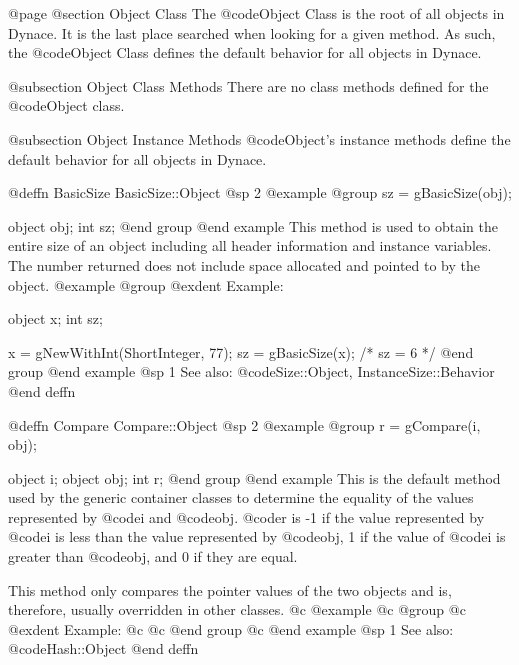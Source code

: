 @page
@section Object Class
The @code{Object} Class is the root of all objects in Dynace.  It is the
last place searched when looking for a given method.  As such, the
@code{Object} Class defines the default behavior for all objects in Dynace.

@subsection Object Class Methods
There are no class methods defined for the @code{Object} class.

@subsection Object Instance Methods
@code{Object}'s instance methods define the default behavior for all objects
in Dynace.











@deffn {BasicSize} BasicSize::Object
@sp 2
@example
@group
sz = gBasicSize(obj);

object  obj;
int     sz;
@end group
@end example
This method is used to obtain the entire size of an object including
all header information and instance variables.  The number returned
does not include space allocated and pointed to by the object.
@example
@group
@exdent Example:

object  x;
int     sz;

x = gNewWithInt(ShortInteger, 77);
sz = gBasicSize(x);    /*  sz = 6  */
@end group
@end example
@sp 1
See also:  @code{Size::Object, InstanceSize::Behavior}
@end deffn
















@deffn {Compare} Compare::Object
@sp 2
@example
@group
r = gCompare(i, obj);

object  i;
object  obj;
int     r;
@end group
@end example
This is the default method used by the generic container classes to
determine the equality of the values represented by @code{i} and
@code{obj}.  @code{r} is -1 if the value represented by @code{i} is less
than the value represented by @code{obj}, 1 if the value of @code{i} is
greater than @code{obj}, and 0 if they are equal.

This method only compares the pointer values of the two objects and is,
therefore, usually overridden in other classes.
@c @example
@c @group
@c @exdent Example:
@c
@c @end group
@c @end example
@sp 1
See also:  @code{Hash::Object}
@end deffn












